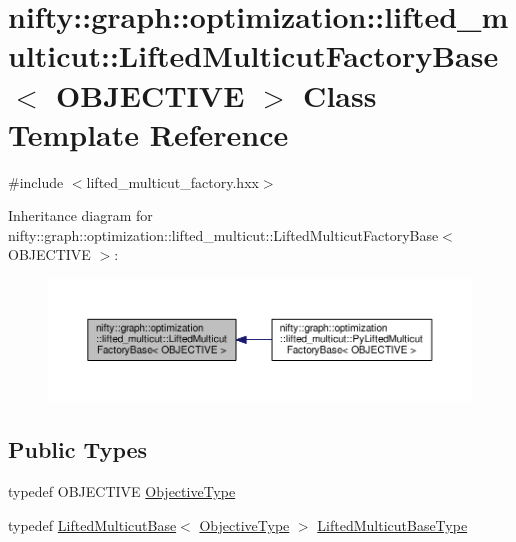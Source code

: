 \hypertarget{classnifty_1_1graph_1_1optimization_1_1lifted__multicut_1_1LiftedMulticutFactoryBase}{}\section{nifty\+:\+:graph\+:\+:optimization\+:\+:lifted\+\_\+multicut\+:\+:Lifted\+Multicut\+Factory\+Base$<$ O\+B\+J\+E\+C\+T\+I\+V\+E $>$ Class Template Reference}
\label{classnifty_1_1graph_1_1optimization_1_1lifted__multicut_1_1LiftedMulticutFactoryBase}


{\ttfamily \#include $<$lifted\+\_\+multicut\+\_\+factory.\+hxx$>$}



Inheritance diagram for nifty\+:\+:graph\+:\+:optimization\+:\+:lifted\+\_\+multicut\+:\+:Lifted\+Multicut\+Factory\+Base$<$ O\+B\+J\+E\+C\+T\+I\+V\+E $>$\+:\nopagebreak
\begin{figure}[H]
\begin{center}
\leavevmode
\includegraphics[width=350pt]{classnifty_1_1graph_1_1optimization_1_1lifted__multicut_1_1LiftedMulticutFactoryBase__inherit__graph}
\end{center}
\end{figure}
\subsection*{Public Types}
\begin{DoxyCompactItemize}
\item 
typedef O\+B\+J\+E\+C\+T\+I\+V\+E \hyperlink{classnifty_1_1graph_1_1optimization_1_1lifted__multicut_1_1LiftedMulticutFactoryBase_a25e776473243feba756c4998e89c35f0}{Objective\+Type}
\item 
typedef \hyperlink{classnifty_1_1graph_1_1optimization_1_1lifted__multicut_1_1LiftedMulticutBase}{Lifted\+Multicut\+Base}$<$ \hyperlink{classnifty_1_1graph_1_1optimization_1_1lifted__multicut_1_1LiftedMulticutFactoryBase_a25e776473243feba756c4998e89c35f0}{Objective\+Type} $>$ \hyperlink{classnifty_1_1graph_1_1optimization_1_1lifted__multicut_1_1LiftedMulticutFactoryBase_adbe8507647f54608c03ce04b42742414}{Lifted\+Multicut\+Base\+Type}
\end{DoxyCompactItemize}
